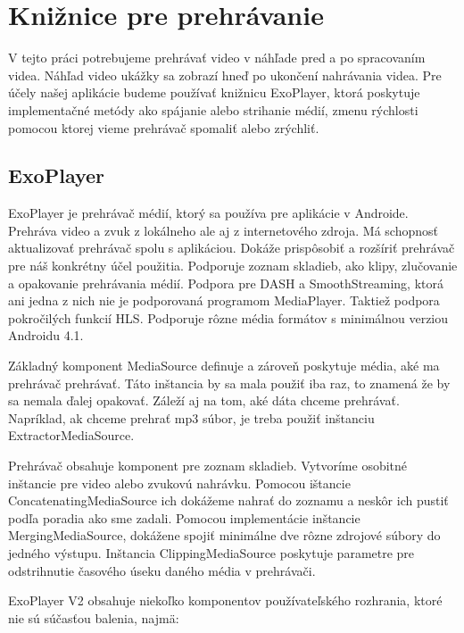 \documentclass[12pt, oneside]{book}
\begin{document}
\cite{CameraKit}

\section{Knižnice pre prehrávanie}

\hspace{15pt} V tejto práci potrebujeme prehrávať video v náhľade pred a po spracovaním videa.  Náhľad video ukážky sa zobrazí hneď po ukončení nahrávania videa. Pre účely našej aplikácie budeme používať knižnicu ExoPlayer, ktorá poskytuje implementačné metódy ako spájanie alebo strihanie médií, zmenu rýchlosti pomocou ktorej vieme prehrávač spomaliť alebo zrýchliť.

\subsection{ExoPlayer}

\hspace{15pt} ExoPlayer je prehrávač médií, ktorý sa používa pre aplikácie v Androide. Prehráva video a zvuk z lokálneho ale aj z internetového zdroja. Má schopnosť aktualizovať prehrávač spolu s aplikáciou. Dokáže prispôsobiť a rozšíriť prehrávač pre náš konkrétny účel použitia. Podporuje zoznam skladieb, ako klipy, zlučovanie a opakovanie prehrávania médií. Podpora pre DASH a SmoothStreaming, ktorá ani jedna z nich nie je podporovaná programom MediaPlayer. Taktiež podpora pokročilých funkcií HLS. Podporuje rôzne média formátov s minimálnou verziou Androidu 4.1.\cite{exoplayer}

Základný komponent MediaSource definuje a zároveň poskytuje média, aké ma prehrávač prehrávať. Táto inštancia by sa mala použiť iba raz, to znamená že by sa nemala ďalej opakovať. Záleží aj na tom, aké dáta chceme prehrávať. Napríklad, ak chceme prehrať mp3 súbor, je treba použiť inštanciu ExtractorMediaSource.

Prehrávač obsahuje komponent pre zoznam skladieb. Vytvoríme osobitné inštancie pre video alebo zvukovú nahrávku. Pomocou ištancie ConcatenatingMediaSource ich dokážeme nahrať do zoznamu a neskôr ich pustiť podľa poradia ako sme zadali. Pomocou implementácie inštancie MergingMediaSource, dokážene spojiť minimálne dve rôzne zdrojové súbory do jedného výstupu. Inštancia ClippingMediaSource poskytuje parametre pre odstrihnutie časového úseku daného média v prehrávači.

ExoPlayer V2 obsahuje niekoľko komponentov používateľského rozhrania, ktoré nie sú súčasťou balenia, najmä:
\end{document}

